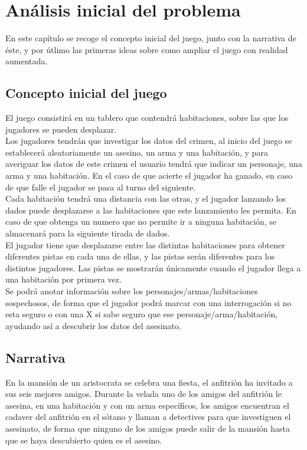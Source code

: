 \chapter{Análisis inicial del problema}
\label{ch:analisis}
En este capítulo se recoge el concepto inicial del juego, junto con la narrativa de éste, y por útlimo las primeras ideas sobre como ampliar el juego con realidad aumentada.

\section{Concepto inicial del juego}
El juego consistirá en un tablero que contendrá habitaciones, sobre las que los jugadores se pueden desplazar.\\

Los jugadores tendrán que investigar los datos del crimen, al inicio del juego se establecerá aleatoriamente un asesino, un arma y una habitación, y para averiguar los datos de este crimen el usuario tendrá que indicar un personaje, una arma y una habitación. En el caso de que acierte el jugador ha ganado, en caso de que falle el jugador se pasa al turno del siguiente.\\

Cada habitación tendrá una distancia con las otras, y el jugador lanzando los dados puede desplazarse a las habitaciones que este lanzamiento les permita. En caso de que obtenga un numero que no permite ir a ninguna habitación, se almacenará para la siguiente tirada de dados.\\

El jugador tiene que desplazarse entre las distintas habitaciones para obtener diferentes pistas en cada una de ellas, y las pistas serán diferentes para los distintos jugadores. Las pistas se mostrarán únicamente cuando el jugador llega a una habitación por primera vez.\\

Se podrá anotar información sobre los personajes/armas/habitaciones sospechosos, de forma que el jugador podrá marcar con una interrogación si no esta seguro o con una X si sabe seguro que ese personaje/arma/habitación, ayudando así a descubrir los datos del asesinato.

\section{Narrativa}
En la mansión de un aristocrata se celebra una fiesta, el anfitrión ha invitado a sus seis mejores amigos. Durante la velada uno de los amigos del anfitrión le asesina, en una habitación y con un arma específicos, los amigos encuentran el cadaver del anfitrión en el sótano y llaman a detectives para que investiguen el asesinato, de forma que ninguno de los amigos puede salir de la mansión hasta que se haya descubierto quien es el asesino.\\

